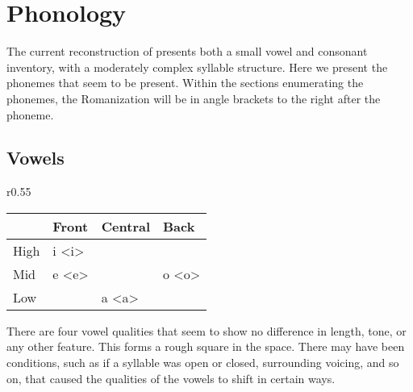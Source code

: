 \section{Phonology}
The current reconstruction of \langname presents both a small vowel and consonant inventory, with a moderately complex syllable structure. Here we present the phonemes that seem to be present. Within the sections enumerating the phonemes, the Romanization will be in angle brackets to the right after the phoneme.
  \subsection{Vowels}
     \begin{wrapfigure}{r}{0.55\textwidth}
       \begin{tabular}{|l|l|l|l|}
         \hline
                 & Front & Central & Back  \\ \hline \hline
         High    & i <i> &         &       \\ \hline
         Mid     & e <e> &         & o <o> \\ \hline
         Low     &       & a <a>   &       \\ \hline
       \end{tabular}
     \end{wrapfigure}
     There are four vowel qualities that seem to show no difference in length, tone, or any other feature. This forms a rough square in the space. There may have been conditions, such as if a syllable was open or closed, surrounding voicing, and so on, that caused the qualities of the vowels to shift in certain ways.
